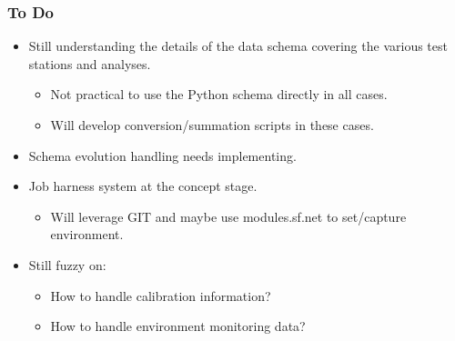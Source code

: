 \documentclass[xcolor=dvipsnames]{beamer}
\begin{document}
\begin{frame}
  \frametitle{To Do}
  \begin{itemize}
  \item Still understanding the details of the data schema covering
    the various test stations and analyses.
    \begin{itemize}
    \item Not practical to use the Python schema directly in all cases.
    \item Will develop conversion/summation scripts in these cases.
    \end{itemize}
  \item Schema evolution handling needs implementing.
  \item Job harness system at the concept stage.
    \begin{itemize}
    \item Will leverage GIT and maybe use modules.sf.net to
      set/capture environment.
    \end{itemize}
  \item Still fuzzy on:
    \begin{itemize}
    \item How to handle calibration information?
    \item How to handle environment monitoring data?
    \end{itemize}
  \end{itemize}
\end{frame}
\end{document}
